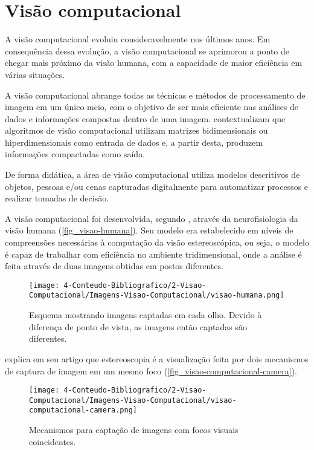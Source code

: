 \section{\textbf{{Visão computacional}}}
\label{visao-computacional}

A visão computacional evoluiu consideravelmente nos últimos anos. Em consequência dessa evolução, a visão computacional se aprimorou a ponto de chegar mais próximo da visão humana, com a capacidade de maior eficiência em várias situações.

A visão computacional abrange todas as técnicas e métodos de processamento de imagem em um único meio, com o objetivo de ser mais eficiente nas análises de dados e informações compostas dentro de uma imagem.  contextualizam que algoritmos de visão computacional utilizam matrizes bidimensionais ou hiperdimensionais como entrada de dados e, a partir desta, produzem informações compactadas como saída.

De forma didática, a área de visão computacional utiliza modelos descritivos de objetos, pessoas e/ou cenas capturadas digitalmente para automatizar processos e realizar tomadas de decisão.

A visão computacional foi desenvolvida, segundo , através da neurofisiologia da visão humana (\autoref{fig_visao-humana}). Seu modelo era estabelecido em níveis de compreensões necessárias à computação da visão estereoscópica, ou seja, o modelo é capaz de trabalhar com eficiência no ambiente tridimensional, onde a análise é feita através de duas imagens obtidas em postos diferentes.

\begin{figure}[h]
	\caption{\label{fig_visao-humana}Esquema mostrando imagens captadas em cada olho. Devido à diferença de
ponto de vista, as imagens então captadas são diferentes.}
	\begin{center}
		\texttt{[image: 4-Conteudo-Bibliografico/2-Visao-Computacional/Imagens-Visao-Computacional/visao-humana.png]}
	\end{center}
	\centering {}
\end{figure}

 explica em seu artigo que estereoscopia é a visualização feita por dois mecanismos de captura de imagem em um mesmo foco (\autoref{fig_visao-computacional-camera}).

\begin{figure}[h]
	\caption{\label{fig_visao-computacional-camera}Mecanismos para captação de imagens com focos visuais coincidentes.}
	\begin{center}
		\texttt{[image: 4-Conteudo-Bibliografico/2-Visao-Computacional/Imagens-Visao-Computacional/visao-computacional-camera.png]}
	\end{center}
	\centering {}
\end{figure}


